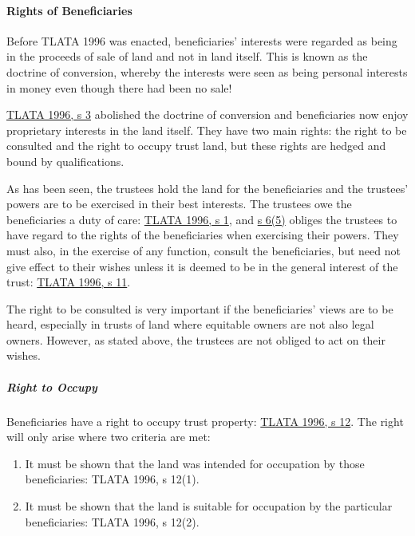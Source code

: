 \documentclass[
]{article}
\providecommand{\tightlist}{%
  \setlength{\itemsep}{0pt}\setlength{\parskip}{0pt}}
\begin{document}
\hypertarget{rights-of-beneficiaries}{%
\paragraph{Rights of Beneficiaries}\label{rights-of-beneficiaries}}

Before TLATA 1996 was enacted, beneficiaries' interests were regarded as
being in the proceeds of sale of land and not in land itself. This is
known as the doctrine of conversion, whereby the interests were seen as
being personal interests in money even though there had been no sale!

\href{https://www.legislation.gov.uk/ukpga/1996/47/section/3}{TLATA
1996, s 3} abolished the doctrine of conversion and beneficiaries now
enjoy proprietary interests in the land itself. They have two main
rights: the right to be consulted and the right to occupy trust land,
but these rights are hedged and bound by qualifications.

As has been seen, the trustees hold the land for the beneficiaries and
the trustees' powers are to be exercised in their best interests. The
trustees owe the beneficiaries a duty of care:
\href{https://www.legislation.gov.uk/ukpga/1996/47/section/1}{TLATA
1996, s 1}, and
\href{https://www.legislation.gov.uk/ukpga/1996/47/section/6}{s 6(5)}
obliges the trustees to have regard to the rights of the beneficiaries
when exercising their powers. They must also, in the exercise of any
function, consult the beneficiaries, but need not give effect to their
wishes unless it is deemed to be in the general interest of the trust:
\href{https://www.legislation.gov.uk/ukpga/1996/47/section/11}{TLATA
1996, s 11}.

The right to be consulted is very important if the beneficiaries' views
are to be heard, especially in trusts of land where equitable owners are
not also legal owners. However, as stated above, the trustees are not
obliged to act on their wishes.

\hypertarget{right-to-occupy}{%
\subparagraph{Right to Occupy}\label{right-to-occupy}}

Beneficiaries have a right to occupy trust property:
\href{https://www.legislation.gov.uk/ukpga/1996/47/section/12}{TLATA
1996, s 12}. The right will only arise where two criteria are met:

\begin{enumerate}
\def\labelenumi{\arabic{enumi}.}
\tightlist
\item
  It must be shown that the land was intended for occupation by those
  beneficiaries: TLATA 1996, s 12(1).
\item
  It must be shown that the land is suitable for occupation by the
  particular beneficiaries: TLATA 1996, s 12(2).
\end{enumerate}
\end{document}
